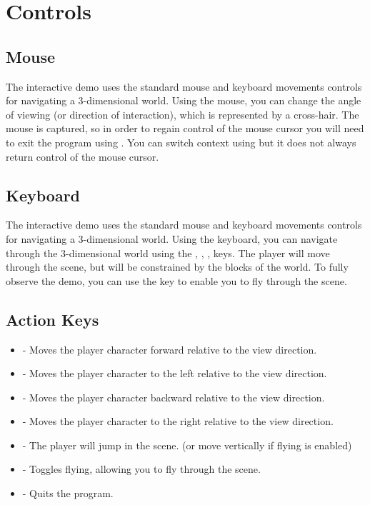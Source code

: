 \documentclass[a4paper,11pt,titlepage]{scrartcl}
\begin{document}
\section{Controls}
\subsection{Mouse}
The interactive demo uses the standard mouse and keyboard movements controls for navigating a 3-dimensional world.  Using the mouse, you can change the angle of viewing (or direction of interaction), which is represented by a cross-hair.  The mouse is captured, so in order to regain control of the mouse cursor you will need to exit the program using .  You can switch context using  but it does not always return control of the mouse cursor.

\subsection{Keyboard}
The interactive demo uses the standard mouse and keyboard movements controls for navigating a 3-dimensional world.   Using the keyboard, you can navigate through the 3-dimensional world using the , , ,  keys.  The player will move through the scene, but will be constrained by the blocks of the world.  To fully observe the demo, you can use the  key to enable you to fly through the scene.

\subsection{Action Keys}
\begin{itemize}
	\item {} - Moves the player character forward relative to the view direction.
	\item {} - Moves the player character to the left relative to the view direction.
	\item {} - Moves the player character backward relative to the view direction.
	\item {} - Moves the player character to the right relative to the view direction.
	\item {} - The player will jump in the scene. (or move vertically if flying is enabled)
	\item {} - Toggles flying, allowing you to fly through the scene.
	\item {} - Quits the program.
\end{itemize}
      
\end{document}
